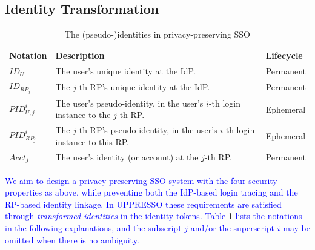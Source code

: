 \subsection{Identity Transformation}
\label{subsec:solutions}

\begin{table}[t]
\footnotesize
    \caption{The (pseudo-)identities in privacy-preserving SSO}
    \centering
    \begin{tabular}{|p{1.0cm}|p{5.1cm}|p{1.13cm}|} \hline
    {\textbf{Notation}} & {\textbf{Description}} & {\textbf{Lifecycle}} \\ \hline
    {$ID_U$} & {The user's unique identity at the IdP.} & {Permanent} \\ \hline
    {$ID_{RP_j}$} & {The $j$-th RP's unique identity at the IdP.} & {Permanent} \\ \hline
    {$PID_{U,j}^i$} & {The user's pseudo-identity, in the user's $i$-th login instance to the $j$-th RP.} & {Ephemeral} \\ \hline
    {$PID_{RP_j}^i$} & {The $j$-th RP's pseudo-identity, in the user's $i$-th login instance to this RP.} & {Ephemeral} \\ \hline
    {$Acct_j$} & {The user's identity (or account) at the $j$-th RP.} & {Permanent} \\ \hline
    \end{tabular}
    \label{tbl:notations-dilemma}
\end{table}


\textcolor{blue}{We aim to design a privacy-preserving SSO system with the four security properties as above,
    while preventing both the IdP-based login tracing and the RP-based identity linkage.
In UPPRESSO these requirements are satisfied through \emph{transformed identities} in the identity tokens.
Table \ref{tbl:notations-dilemma} lists the notations in the following explanations,
    and the subscript $j$ and/or the superscript $i$ may be omitted when there is no ambiguity.}

